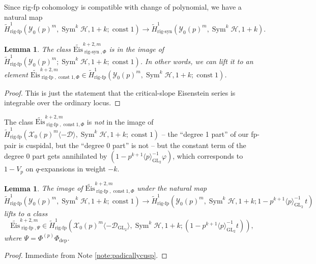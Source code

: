 \documentclass[cjm]{ipart}
\theoremstyle{plain}
\newtheorem{lemma}[theorem]{Lemma}
\theoremstyle{remark}
\DeclareMathOperator{\GL}{GL}
\DeclareMathOperator{\rigfp}{rig-fp}
\DeclareMathOperator{\rigsyn}{rig-syn}
\DeclareMathOperator{\Sym}{Sym}
\newcommand{\Eis}{\mathrm{Eis}}
\newcommand{\cD}{\mathcal{D}}
\newcommand{\cX}{\mathcal{X}}
\newcommand{\cY}{\mathcal{Y}}
\newcommand{\dep}{\mathrm{dep}}
\newcommand{\sH}{\mathscr{H}}
\newcommand{\wH}{\widetilde{H}}
\numberwithin{equation}{subsection}
\begin{document}
Since rig-fp cohomology is compatible with change of polynomial,  we have a natural map
\[ \wH^1_{\rigfp}\left(\cY_0(p)^{m}, \Sym^k\sH,1+k;\operatorname{const} 1\right)\to \wH^1_{\rigsyn}\left(\cY_0(p)^{m},\Sym^k\sH,1+k\right).\]

\begin{lemma}
 The class $\widetilde{\Eis}_{\rigsyn,\Phi}^{k+2,m}$ is in the image of $\wH^1_{\rigfp}(\cY_0(p)^{m}; \Sym^k\sH,1+k;\operatorname{const} 1)$. In other words,  we can lift it to an element $\widetilde{\Eis}_{\rigfp,\operatorname{const} 1,\Phi}^{k+2,m}\in \wH^1_{\rigfp}(\cY_0(p)^{m},\Sym^k\sH,1+k; \operatorname{const} 1)$.
\end{lemma}
\begin{proof}
 This is just the statement that the critical-slope Eisenstein series is integrable over the ordinary locus.
\end{proof}

\begin{note}\label{note:padicallycusp}
 The class $\widetilde{\Eis}_{\rigfp,\operatorname{const} 1,\Phi}^{k+2,m}$  is \emph{not} in the image of $\wH^1_{\rigfp}(\cX_0(p)^{m}\langle -\cD\rangle,  \Sym^k\sH,1+k; \operatorname{const} 1)$ -- the ``degree 1 part'' of our fp-pair is cuspidal, but the ``degree 0 part'' is not -- but the constant term of the degree 0 part gets annihilated by $(1-p^{k+1}\langle p \rangle_{\GL_2}^{-1} \varphi)$, which corresponds to $1 - V_p$ on $q$-expansions in weight $-k$.
\end{note}


\begin{lemma}
 The image of $\widetilde{\Eis}_{\rigfp,\operatorname{const} 1,\Phi}^{k+2,m}$ under the natural map
 \[ \wH^1_{\rigfp}\left(\cY_0(p)^{m},  \Sym^k\sH,1+k;\operatorname{const} 1\right)\to \wH^1_{\rigfp}\left(\cY_0(p)^{m},  \Sym^k\sH,1+k;1-p^{k+1}\langle p \rangle^{-1}_{\GL_2}\, t\right)\]
 lifts to a class \[\widetilde{\Eis}_{\rigfp,\Psi}^{k+2,m}\in\wH^1_{\rigfp}(\cX_0(p)^{m}\langle -\cD_{\GL_2}\rangle, \Sym^k\sH,1+k; (1-p^{k+1}\langle p \rangle^{-1}_{\GL_2} t)),\]
    where $\Psi=\Phi^{(p)}\Phi_{\dep}$.
\end{lemma}
\begin{proof}
 Immediate from Note \ref{note:padicallycusp}.
\end{proof}
\end{document}
